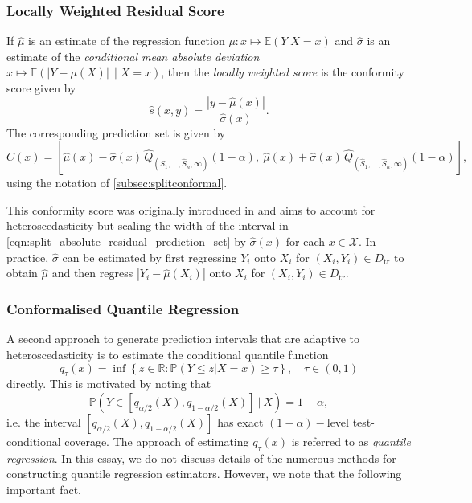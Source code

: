 \documentclass[11pt, titlepage]{article} %
\newcommand{\R}{\mathrm}
\newcommand{\Prob}[1]{\mathbb{P}\left( #1 \right)}
\newcommand{\Exp}[3]{\mathbb{E}\left#2 #1 \right#3}
\numberwithin{equation}{section}
\theoremstyle{definition}
\numberwithin{theorem}{section}
\numberwithin{lemma}{section}
\numberwithin{corollary}{section}
\numberwithin{proposition}{section}
\numberwithin{definition}{section}
\numberwithin{remark}{section}
\begin{document}
\subsubsection{Locally Weighted Residual Score}

If \(\hat{\mu}\) is an estimate of the regression function \(\mu:x \mapsto \Exp{Y | X = x}{(}{)}\) and \(\hat{\sigma}\) is an estimate of the \textit{conditional mean absolute deviation} \(x \mapsto \Exp{|Y-\mu(X)| \, \mid X = x}{(}{)}\), then the \textit{locally weighted score} is the conformity score given by \begin{equation}
    \hat{s}(x,y) = \frac{| y - \hat{\mu}(x)|}{\hat{\sigma}(x)}.
\end{equation} The corresponding prediction set is given by \begin{equation}
    C(x) = \left[ \hat{\mu}(x) - \hat{\sigma}(x) \, \hat{Q}_{(\hat{S}_1, \ldots, \hat{S}_n, \infty)}(1-\alpha), \ \hat{\mu}(x) + \hat{\sigma}(x) \, \hat{Q}_{(\hat{S}_1, \ldots, \hat{S}_n, \infty)}(1-\alpha) \right],
\end{equation} using the notation of \cref{subsec:splitconformal}. \vskip5pt

\noindent
This conformity score was originally introduced in \cite{lei2018} and aims to account for heteroscedasticity but scaling the width of the interval in \eqref{eqn:split_absolute_residual_prediction_set} by \(\hat{\sigma}(x)\) for each \(x \in \mathcal{X}\). In practice, \(\hat{\sigma}\) can be estimated by first regressing \(Y_i\) onto \(X_i\) for \((X_i, Y_i) \in D_\R{tr}\) to obtain \(\hat{\mu}\) and then regress \(|Y_i -\hat{\mu}(X_i)|\) onto \(X_i\) for \((X_i, Y_i) \in D_\R{tr}\).

\subsubsection{Conformalised Quantile Regression}

A second approach to generate prediction intervals that are adaptive to heteroscedasticity is to estimate the conditional quantile function \begin{equation}
    q_{\tau}(x) = \inf \left\{ z \in \mathbb{R}: \Prob{Y \leq z | X = x} \geq \tau \right\}, \quad \tau \in (0,1)
\end{equation} directly. This is motivated by noting that \[\Prob{Y \in [q_{\alpha/2}(X), q_{1-\alpha/2}(X)] \ | \  X} = 1-\alpha,\] i.e. the interval \([q_{\alpha/2}(X), q_{1-\alpha/2}(X)]\) has exact \((1-\alpha)-\)level test-conditional coverage. The approach of estimating \(q_\tau(x)\) is referred to as \textit{quantile regression}. In this essay, we do not discuss details of the numerous methods for constructing quantile regression estimators. However, we note that the following important fact. \vskip5pt
\end{document}
